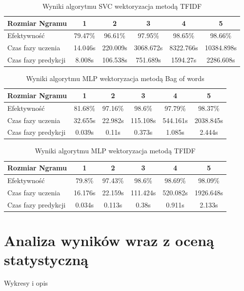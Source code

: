 \begin{table}[h!]
    \centering
    \caption{Wyniki algorytmu SVC wektoryzacja metodą TFIDF}
    \begin{tabular}{ | l | c | c | c | c | c |}
        \hline
        Rozmiar Ngramu & 1 & 2 & 3 & 4 & 5   \\ \hline
        Efektywność & 79.47\% & 96.61\% & 97.95\% & 98.65\% & 98.66\% \\ \hline
        Czas fazy uczenia & 14.046s & 220.009s & 3068.672s & 8322.766s & 10384.898s \\ \hline
        Czas fazy predykcji & 8.008s & 106.538s & 751.689s & 1594.27s & 2286.608s  \\ \hline
    \end{tabular}
\end{table}

\begin{table}[h!]
    \centering
    \caption{Wyniki algorytmu MLP wektoryzacja metodą Bag of words}
    \begin{tabular}{ | l | c | c | c | c | c |}
        \hline
        Rozmiar Ngramu & 1 & 2 & 3 & 4 & 5  \\ \hline
        Efektywność & 81.68\% & 97.16\% & 98.6\% & 97.79\% & 98.37\%   \\ \hline
        Czas fazy uczenia & 32.655s & 22.982s & 115.108s & 544.161s & 2038.845s  \\ \hline
        Czas fazy predykcji & 0.039s & 0.11s & 0.373s & 1.085s & 2.444s  \\ \hline
    \end{tabular}
\end{table}

\begin{table}[h!]
    \centering
    \caption{Wyniki algorytmu MLP wektoryzacja metodą TFIDF}
    \begin{tabular}{ | l | c | c | c | c | c |}
        \hline
        Rozmiar Ngramu & 1 & 2 & 3 & 4 & 5   \\ \hline
        Efektywność & 79.8\% & 97.43\% & 98.6\% & 98.69\% & 98.09\%   \\ \hline
        Czas fazy uczenia & 16.176s & 22.159s & 111.424s & 520.082s & 1926.648s  \\ \hline
        Czas fazy predykcji & 0.034s & 0.113s & 0.38s & 0.911s & 2.133s  \\ \hline
    \end{tabular}
\end{table}
\section{Analiza wyników wraz z oceną statystyczną}
Wykresy i opis


